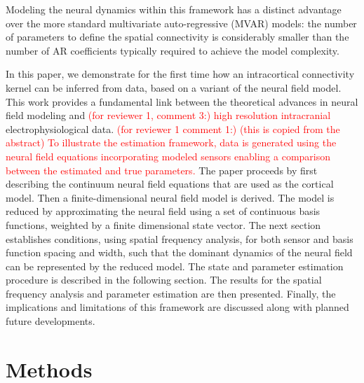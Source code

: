 \documentclass[review,authoryear,3p]{elsarticle}
\newcommand{\dean}[1]{\textcolor{red}{#1}}
\begin{document}
Modeling the neural dynamics within this framework has a distinct advantage over the more standard multivariate auto-regressive (MVAR) models: the number of parameters to define the spatial connectivity is considerably smaller than the number of AR coefficients typically required to achieve the model complexity. 

In this paper, we demonstrate for the first time how an intracortical connectivity kernel can be inferred from data, based on a variant of the \citet{Wilson1973} neural field model. This work provides a fundamental link between the theoretical advances in neural field modeling and \dean{(for reviewer 1, comment 3:) high resolution intracranial} electrophysiological data. \dean{(for reviewer 1 comment 1:) (this is copied from the abstract) To illustrate the estimation framework, data is generated using the neural field equations incorporating modeled sensors enabling a comparison between the estimated and true parameters.} The paper proceeds by first describing the continuum neural field equations that are used as the cortical model. Then a finite-dimensional neural field model is derived. The model is reduced by approximating the neural field using a set of continuous basis functions, weighted by a finite dimensional state vector. The next section establishes conditions, using spatial frequency analysis, for both sensor and basis function spacing and width, such that the dominant dynamics of the neural field can be represented by the reduced model. The state and parameter estimation procedure is described in the following section. The results for the spatial frequency analysis and parameter estimation are then presented. Finally, the implications and limitations of this framework are discussed along with planned future developments.

\section{Methods}
\end{document}

